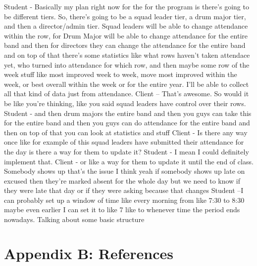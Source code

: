 \documentclass{article}
\begin{document}
Student - Basically my plan right now for the for the program is there's going to be different tiers. So, there’s going to be a squad leader tier, a drum major tier, and then a director/admin tier. Squad leaders will be able to change attendance within the row, for Drum Major will be able to change attendance for the entire band and then for directors they can change the attendance for the entire band and on top of that there's some statistics like what rows haven't taken attendace yet, who turned into attendance for which row, and then maybe some row of the week stuff like most improved week to week, move most improved within the week, or best overall within the week or for the entire year. I’ll be able to collect all that kind of data just from attendance.
Client – That’s awesome. So would it be like you're thinking, like you said squad leaders have control over their rows. 
Student - and then drum majors the entire band and then you guys can take this for the entire band and then you guys can do attendance for the entire band and then on top of that you can look at statistics and stuff
Client - Is there any way once like for example of this squad leaders have submitted their attendance for the day is there a way for them to update it?
Student - I mean I could definitely implement that.
Client - or like a way for them to update it until the end of class. Somebody shows up that's the issue I think yeah if somebody shows up late on excused then they're marked absent for the whole day but we need to know if they were late that day or if they were asking because that changes 
Student –I can probably set up a window of time like every morning from like 7:30 to 8:30 maybe even earlier I can set it to like 7 like to whenever time the period ends nowadays. Talking about some basic structure %
\newpage
\section{Appendix B: References}
{}

\end{document}
